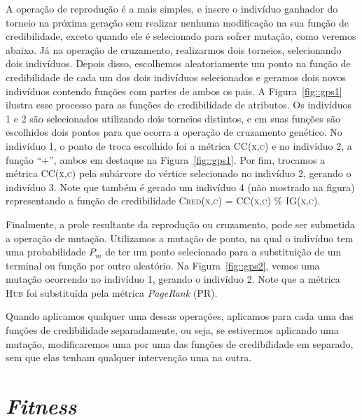 A operação de reprodução é a mais simples, e insere o indivíduo ganhador do torneio na próxima geração sem realizar nenhuma modificação na sua função de credibilidade, exceto quando ele é selecionado para sofrer mutação, como veremos abaixo. Já na operação de cruzamento, realizarmos dois torneios, selecionando dois indivíduos. 
Depois disso, escolhemos aleatoriamente um ponto na função de credibilidade de cada um dos dois indivíduos selecionados e geramos dois novos indivíduos contendo funções com partes de ambos os pais. A Figura~\ref{fig::gps1} ilustra esse processo para as funções de credibilidade de atributos. 
Os indivíduos 1 e 2 são selecionados utilizando dois torneios distintos, e em suas funções são escolhidos dois pontos para que ocorra a operação de cruzamento genético. 
No indivíduo 1, o ponto de troca escolhido foi a métrica 
\textsc{CC(x,c)} 
e no indivíduo 2, a função ``+'', ambos em destaque na Figura~\ref{fig::gps1}.
Por fim, trocamos a métrica \textsc{CC(x,c)} pela subárvore do vértice selecionado no indivíduo 2, gerando o indivíduo 3. 
Note que também é gerado um indivíduo 4 (não mostrado na figura) representando a função de credibilidade \textsc{Cred(x,c) = CC(x,c) \% IG(x,c)}. 

Finalmente, a prole resultante da reprodução ou cruzamento, pode ser submetida a operação de mutação. Utilizamos a mutação de ponto, na qual o indivíduo tem uma probabilidade $P_m$ de ter um ponto selecionado para a substituição de um terminal ou função por outro aleatório.
Na Figura~\ref{fig::gps2}, vemos uma mutação ocorrendo no indivíduo 1, gerando o indivíduo 2. Note que a métrica \textsc{Hub} foi substituída pela métrica \textit{PageRank} (\textsc{PR}).

Quando aplicamos qualquer uma dessas operações, aplicamos para cada uma das funções de credibilidade separadamente, ou seja, se estivermos aplicando uma mutação, modificaremos uma por uma das funções de credibilidade em separado, sem que elas tenham qualquer intervenção uma na outra.


\section{\textit{Fitness}}
\label{subsec::fitness}

